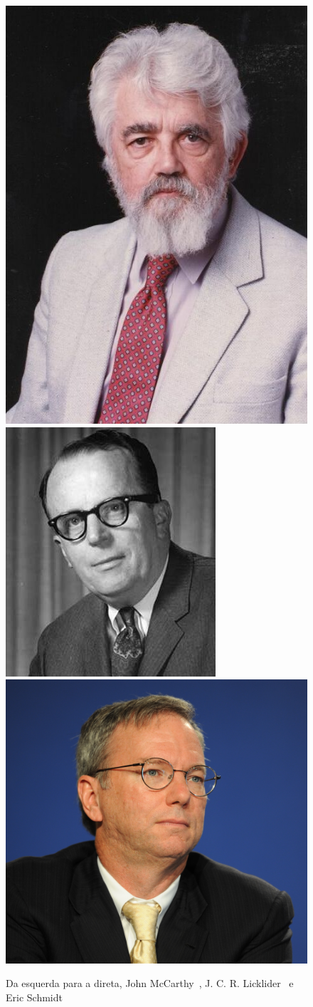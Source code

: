 \begin{figure}[ht]
    \centering
    \includegraphics[height=0.3\textwidth]{img/mcCarthy.jpg}
    \includegraphics[height=0.3\textwidth]{img/licklider.jpg}
    \includegraphics[height=0.3\textwidth]{img/schmidt.jpg}
    \caption{Da esquerda para a direta, John McCarthy~\cite{stanford-mccarthy-obit},
        J. C. R. Licklider~\cite{atimes-zoya-phantom} e Eric
        Schmidt~\cite{forbes-eric-schmidt:online}}
\end{figure}
